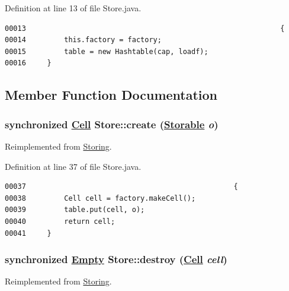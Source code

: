 Definition at line 13 of file Store.java.\footnotesize\begin{verbatim}00013                                                            {
00014         this.factory = factory;
00015         table = new Hashtable(cap, loadf);
00016     }
\end{verbatim}\normalsize 


\subsection{Member Function Documentation}
\hypertarget{classStore_a0}{
\subsubsection[create]{\setlength{\rightskip}{0pt plus 5cm}synchronized \hyperlink{interfaceCell}{Cell} Store::create (\hyperlink{interfaceStorable}{Storable} {\em o})}}
\label{classStore_a0}




Reimplemented from \hyperlink{interfaceStoring_a0}{Storing}.

Definition at line 37 of file Store.java.\footnotesize\begin{verbatim}00037                                                 {
00038         Cell cell = factory.makeCell();
00039         table.put(cell, o);
00040         return cell;    
00041     }
\end{verbatim}\normalsize 
\hypertarget{classStore_a1}{
\subsubsection[destroy]{\setlength{\rightskip}{0pt plus 5cm}synchronized \hyperlink{interfaceEmpty}{Empty} Store::destroy (\hyperlink{interfaceCell}{Cell} {\em cell})}}
\label{classStore_a1}




Reimplemented from \hyperlink{interfaceStoring_a1}{Storing}.

